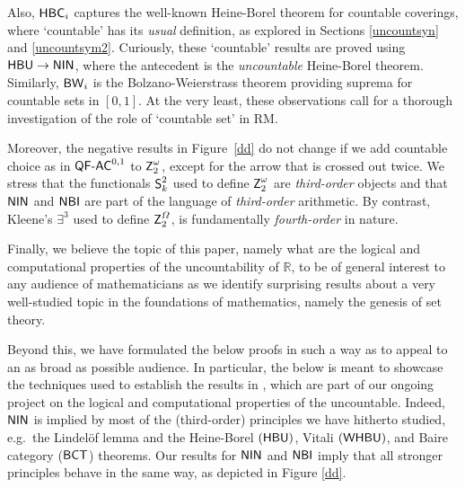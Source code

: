 \documentclass[reqno]{amsart}
\def\Z{\textup{\textsf{Z}}}
\def\R{{\mathbb  R}}
\def\di{\rightarrow}
\def\QFAC{\textup{\textsf{QF-AC}}}
\def\HBU{\textup{\textsf{HBU}}}
\def\BW{\textup{\textsf{BW}}}
\def\NBI{\textup{\textsf{NBI}}}
\def\NIN{\textup{\textsf{NIN}}}
\def\BCT{\textup{\textsf{BCT}}}
\def\SS{\textup{\textsf{S}}}
\def\WHBU{\textup{\textsf{WHBU}}}
\def\HBC{\textup{\textsf{HBC}}}
\numberwithin{equation}{section}
\numberwithin{thm}{section}
\begin{document}
Also, $\HBC_{i}$ captures the well-known Heine-Borel theorem for countable coverings, where `countable' has its \emph{usual} definition, as explored in Sections \ref{uncountsyn} and \ref{uncountsym2}.
Curiously, these `countable' results are proved using $\HBU\di \NIN$, where the antecedent is the \emph{uncountable} Heine-Borel theorem.  Similarly, $\BW_{i}$ is the Bolzano-Weierstrass theorem providing suprema for countable sets in $[0,1]$. 
At the very least, these observations call for a thorough investigation of the role of `countable set' in RM. 

\smallskip

Moreover, the negative results in Figure~\ref{dd} do not change if we add countable choice as in $\QFAC^{0,1}$ to $\Z_{2}^{\omega}$, except for the arrow that is crossed out twice.  
We stress that the functionals $\SS_{k}^{2}$ used to define $\Z_{2}^{\omega}$ are \emph{third-order} objects and that $\NIN$ and $\NBI$ are part of the language of \emph{third-order} arithmetic.  
By contrast, Kleene's $\exists^{3}$ used to define $\Z_{2}^{\Omega}$, is fundamentally \emph{fourth-order} in nature.  

\smallskip

Finally, we believe the topic of this paper, namely what are the logical and computational properties of the uncountability of $\R$, to be of general interest to any audience of mathematicians as we identify surprising results about 
a very well-studied topic in the foundations of mathematics, namely the genesis of set theory.  

\smallskip

Beyond this, we have formulated the below proofs in such a way as to appeal to an as broad as possible audience.  In particular, the below is meant to showcase the techniques used to establish the results in \cites{dagsamIII, dagsamV, dagsamVI, dagsamVII}, which are part of our ongoing project on the logical and computational properties of the uncountable.  Indeed, $\NIN$ is implied by most of the (third-order) principles we have hitherto studied, e.g.\ the Lindel\"of lemma and the Heine-Borel $(\HBU)$, Vitali $(\WHBU)$, and Baire category ($\BCT$) theorems.  %
Our results for $\NIN$ and $\NBI$ imply that all stronger principles behave in the same way, as depicted in Figure \ref{dd}.
\end{document}
